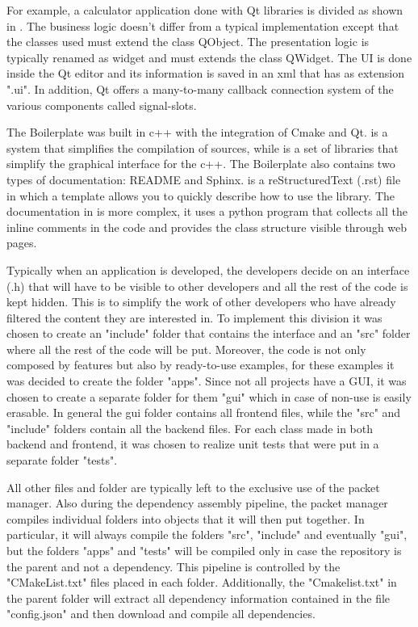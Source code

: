 For example, a calculator application done with Qt libraries is divided as shown in . The business logic doesn't differ from a typical implementation except that the classes used must extend the class QObject. The presentation logic is typically renamed as widget and must extends the class QWidget. The UI is done inside the Qt editor and its information is saved in an xml that has as extension ".ui". In addition, Qt offers a many-to-many callback connection system of the various components called signal-slots.


The Boilerplate was built in c++ with the integration of Cmake and Qt.
 is a system that simplifies the compilation of sources, while  is a set of libraries that simplify the graphical interface for the c++. The Boilerplate also contains two types of documentation: README and Sphinx.
 is a reStructuredText (.rst) file in which a template allows you to quickly describe how to use the library.
The documentation in  is more complex, it uses a python program that collects all the inline comments in the code and provides the class structure visible through web pages.

Typically when an application is developed, the developers decide on an interface (.h) that will have to be visible to other developers and all the rest of the code is kept hidden. This is to simplify the work of other developers who have already filtered the content they are interested in.
To implement this division it was chosen to create an "include" folder that contains the interface and an "src" folder where all the rest of the code will be put.
Moreover, the code is not only composed by features but also by ready-to-use examples, for these examples it was decided to create the folder "apps".
Since not all projects have a GUI, it was chosen to create a separate folder for them "gui" which in case of non-use is easily erasable.
In general the gui folder contains all frontend files, while the "src" and "include" folders contain all the backend files.
For each class made in both backend and frontend, it was chosen to realize unit tests that were put in a separate folder "tests".

All other files and folder are typically left to the exclusive use of the packet manager.
Also during the dependency assembly pipeline, the packet manager compiles individual folders into objects that it will then put together. In particular, it will always compile the folders "src", "include" and eventually "gui", but the folders "apps" and "tests" will be compiled only in case the repository is the parent and not a dependency. This pipeline is controlled by the "CMakeList.txt" files placed in each folder.
Additionally, the "Cmakelist.txt" in the parent folder will extract all dependency information contained in the file "config.json" and then download and compile all dependencies.

